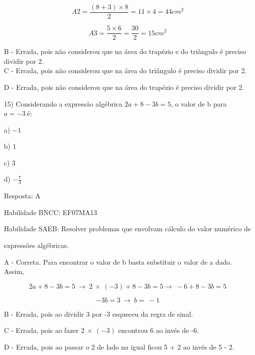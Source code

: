\[A2 = \frac{\left( 8 + 3 \right) \times 8}{2} = 11 \times 4 = 44cm^{2}\]

\[A3 = \frac{5 \times 6}{2} = \frac{30}{2} = 15cm^{2}\]



B - Errada, pois não considerou que na área do trapézio e do triângulo é
preciso dividir por 2.\\
C - Errada, pois não considerou que na área do triângulo é preciso
dividir por 2.

D - Errada, pois não considerou que na área do trapézio é preciso
dividir por 2.

15) Considerando a expressão algébrica \(2a + 8 - 3b = 5\), o valor de b
para \(a = - 3\ \)é:

a) \(- 1\)

b) \(1\)

c) \(3\)

d) \(- \frac{7}{3}\)

Resposta: A

Habilidade BNCC: EF07MA13

Habilidade SAEB: Resolver problemas que envolvam cálculo do valor
numérico de

expressões algébricas.

A - Correta. Para encontrar o valor de b basta substituir o valor de a
dado. Assim,

\[2a + 8 - 3b = 5\  \rightarrow \ 2\  \times \ \left( - 3 \right) + 8 - 3b = 5 \rightarrow \  - 6 + 8 - 3b = 5\]

\[- 3b = 3\  \rightarrow \ b = \  - 1\]

B - Errada, pois ao dividir 3 por -3 esqueceu da regra de sinal.

C - Errada, pois ao fazer \(2\  \times \ \left( - 3 \right)\) encontrou
6 ao invés de -6.

D - Errada, pois ao passar o 2 de lado na igual ficou 5 + 2 ao invés de
5 - 2.

